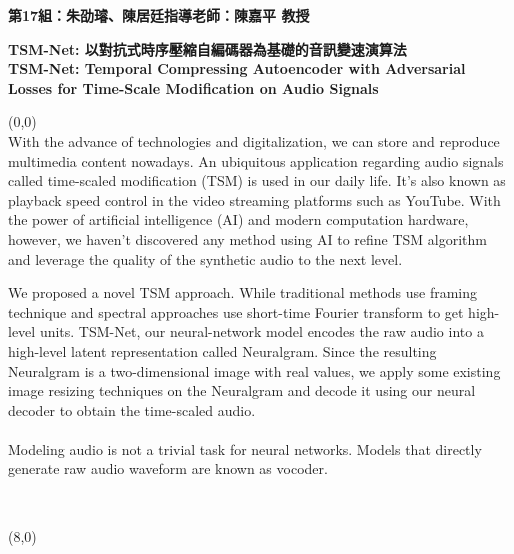 \documentclass{article}
\begin{document}
\thispagestyle{empty}
\membersize \textbf{第17組：朱劭璿、陳居廷}\hspace{20.5cm}\textbf{指導老師：陳嘉平 教授}
\bigskip

\titlesize \textbf{TSM-Net: 以對抗式時序壓縮自編碼器為基礎的音訊變速演算法 \\
TSM-Net: Temporal Compressing Autoencoder with Adversarial Losses for Time-Scale Modification on Audio Signals}

\begin{textblock}{7.0}(0,0)
 \\
\Large
With the advance of technologies and digitalization, we can store and reproduce multimedia content nowadays. An ubiquitous application regarding audio signals called time-scaled modification (TSM) is used in our daily life. It's also known as playback speed control in the video streaming platforms such as YouTube. With the power of artificial intelligence (AI) and modern computation hardware, however, we haven't discovered any method using AI to refine TSM algorithm and leverage the quality of the synthetic audio to the next level.

We proposed a novel TSM approach. While traditional methods use framing technique and spectral approaches use short-time Fourier transform to get high-level units. TSM-Net, our neural-network model encodes the raw audio into a high-level latent representation called Neuralgram. Since the resulting Neuralgram is a two-dimensional image with real values, we apply some existing image resizing techniques on the Neuralgram and decode it using our neural decoder to obtain the time-scaled audio. \\

\medskip
{} \\
\Large
 Modeling audio is not a trivial task for neural networks. Models that directly generate raw audio waveform are known as vocoder.



\medskip
{} \\
\Large \lipsum[3-3]
\end{textblock}

\begin{textblock}{7.0}(8,0)
 \\
\Large \lipsum[4-4]
\large 

\medskip
{} \\
\Large \lipsum[5-5]
\end{textblock}
\end{document}
